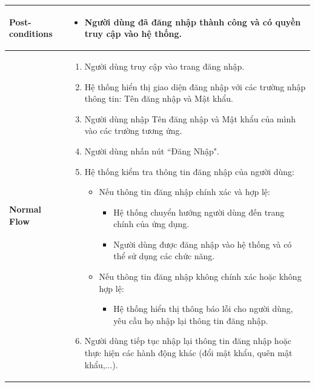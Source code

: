 \begin{longtable}[H]{|l|p{}|}
    \hline
        \textbf{Post-conditions} & \vspace{-1cm}  \begin{itemize} [leftmargin=4mm]
            \setlength\itemsep{0em}
            \item Người dùng đã đăng nhập thành công và có quyền truy cập vào hệ thống.
        \end{itemize} \\
    \hline
        \textbf{Normal Flow} & \vspace{-1cm} \begin{enumerate}[leftmargin=5.5mm]
            \setlength\itemsep{0em}
            \item Người dùng truy cập vào trang đăng nhập.
            \item Hệ thống hiển thị giao diện đăng nhập với các trường nhập thông tin: Tên đăng nhập và Mật khẩu.
            \item Người dùng nhập Tên đăng nhập và Mật khẩu của mình vào các trường tương ứng.
            \item Người dùng nhấn nút ``Đăng Nhập".
            \item Hệ thống kiểm tra thông tin đăng nhập của người dùng:
                \begin{itemize}
                    \item Nếu thông tin đăng nhập chính xác và hợp lệ:
                        \begin{itemize}
                            \item Hệ thống chuyển hướng người dùng đến trang chính của ứng dụng.
                            \item Người dùng được đăng nhập vào hệ thống và có thể sử dụng các chức năng.
                        \end{itemize}
                    \item Nếu thông tin đăng nhập không chính xác hoặc không hợp lệ:
                        \begin{itemize}
                            \item Hệ thống hiển thị thông báo lỗi cho người dùng, yêu cầu họ nhập lại thông tin đăng nhập.
                        \end{itemize}
                \end{itemize}
            \item Người dùng tiếp tục nhập lại thông tin đăng nhập hoặc thực hiện các hành động khác (đổi mật khẩu, quên mật khẩu,...).
        \end{enumerate} \\

\end{longtable}
